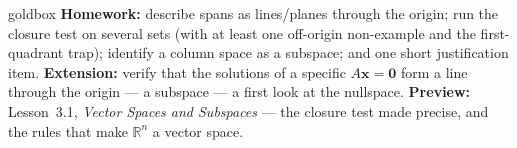 \documentclass[10pt]{article}
\newcommand{\zero}{\mathbf{0}}
\begin{document}
\begin{skillbox}{goldbox}
\textbf{Homework:} describe spans as lines/planes through the origin; run the closure test on
several sets (with at least one off-origin non-example and the first-quadrant trap); identify a
column space as a subspace; and one short justification item. \textbf{Extension:} verify that the
solutions of a specific $A\mathbf x=\zero$ form a line through the origin --- a subspace --- a
first look at the nullspace. \textbf{Preview:} Lesson~3.1, \emph{Vector Spaces and Subspaces} ---
the closure test made precise, and the rules that make $\mathbb{R}^n$ a vector space.
\end{skillbox}
\end{document}
